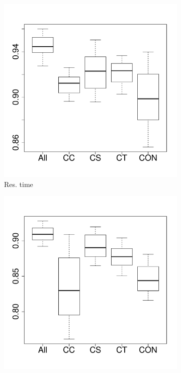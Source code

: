 \documentclass[10pt,journal,compsoc]{IEEEtran}
\begin{document}
\begin{figure}[t]
	\centering
        \begin{subfigure}{0.19\textwidth}
                \includegraphics[width=\linewidth]{Figures/runtime-hadoopremove-importance.pdf}
                \caption{Res. time}
        \end{subfigure}%
        \begin{subfigure}{0.19\textwidth}
                \includegraphics[width=\linewidth]{Figures/cpu-hadoopremove-importance.pdf}

\end{subfigure}
\end{figure}
\end{document}

